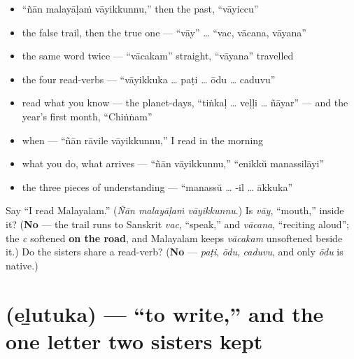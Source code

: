 \begin{itemize}
\raggedright
  \item \textquotedblleft{}ñān malayāḷaṁ vāyikkunnu,\textquotedblright{} then the past, \textquotedblleft{}vāyiccu\textquotedblright{}
  \item the false trail, then the true one — \textquotedblleft{}vāy\textquotedblright{} … \textquotedblleft{}vac, vācana, vāyana\textquotedblright{}
  \item the same word twice — \textquotedblleft{}vācakam\textquotedblright{} straight, \textquotedblleft{}vāyana\textquotedblright{} travelled
  \item the four read-verbs — \textquotedblleft{}vāyikkuka … paṭi … ōdu … caduvu\textquotedblright{}
  \item read what you know — the planet-days, \textquotedblleft{}tiṅkaḷ … veḷḷi … ñāyar\textquotedblright{} — and the year's first month, \textquotedblleft{}Chiṅṅam\textquotedblright{}
  \item when — \textquotedblleft{}ñān rāvile vāyikkunnu,\textquotedblright{} I read in the morning
  \item what you do, what arrives — \textquotedblleft{}ñān vāyikkunnu,\textquotedblright{} \textquotedblleft{}enikkŭ manassilāyi\textquotedblright{}
  \item the three pieces of understanding — \textquotedblleft{}manassŭ … ‑il … ākkuka\textquotedblright{}
\end{itemize}

\begin{tcolorbox}[breakable,colback=teal!4,colframe=teal!35!black,title={Before you move on}]
Say \textquotedblleft{}I read Malayalam.\textquotedblright{} (\emph{Ñān malayāḷaṁ vāyikkunnu}.) Is \emph{vāy}, \textquotedblleft{}mouth,\textquotedblright{} inside it? (\textbf{No} — the trail runs to Sanskrit \emph{vac}, \textquotedblleft{}speak,\textquotedblright{} and \emph{vācana}, \textquotedblleft{}reciting aloud\textquotedblright{}; the \emph{c} softened \textbf{on the road}, and Malayalam keeps \emph{vācakam} unsoftened beside it.) Do the sisters share a read-verb? (\textbf{No} — \emph{paṭi}, \emph{ōdu}, \emph{caduvu}, and only \emph{ōdu} is native.)
\end{tcolorbox}
\section[\texorpdfstring{\ml{എഴുതുക} (eḻutuka)}{എഴുതുക (eḻutuka)}]{ (eḻutuka) — \textquotedblleft{}to write,\textquotedblright{} and the one letter two sisters kept}

